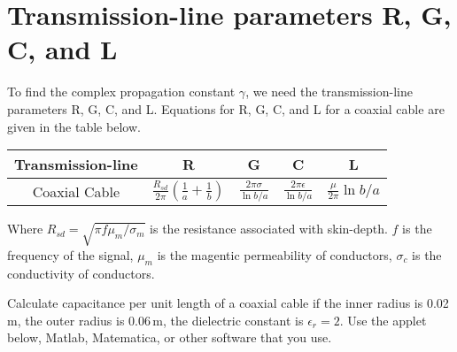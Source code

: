 \documentclass{ximera}
\begin{document}
\section{Transmission-line parameters R, G, C, and L}

To find the complex propagation constant $\gamma$, we need the transmission-line parameters R, G, C, and L. Equations for R, G, C, and L for a coaxial cable are given in the table below. 

\begin{center}
\begin{tabular}{|c|c|c|c|c|} \hline
Transmission-line    & R  & G & C &L     \\  \hline       
Coaxial Cable       & $\frac{R_{sd}}{2 \pi} \left(\frac{1}{a} +  \frac{1}{b} \right)$   & $\frac{2 \pi \sigma}{\ln b/a}$ &$\frac{2 \pi \epsilon}{\ln b/a}$& $\frac{\mu}{2 \pi } \ln b/a$                             \\ \hline    
\end{tabular}
\end{center}

Where $R_{sd} = \sqrt{\pi f \mu_m/\sigma_m}$ is the resistance associated with skin-depth. $f$ is the frequency of the signal, $\mu_m$ is the magentic permeability of conductors, $\sigma_c$ is the conductivity of conductors.

\begin{example}
Calculate capacitance per unit length of a coaxial cable if the inner radius is 0.02\,m, the outer radius is 0.06\,m, the dielectric constant is $\epsilon_r=2$. Use the applet below, Matlab, Matematica, or other software that you use.

\begin{center}  
\end{center} 

\end{example}
\end{document}
